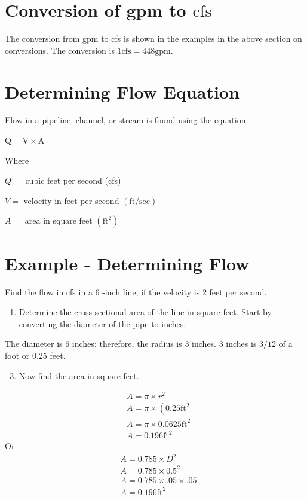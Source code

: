 \documentclass[10pt]{article}
\begin{document}
\section{Conversion of gpm to $\mathrm{cfs}$}
The conversion from gpm to cfs is shown in the examples in the above section on conversions. The conversion is $1 \mathrm{cfs}=448 \mathrm{gpm}$.

\section{Determining Flow Equation}
Flow in a pipeline, channel, or stream is found using the equation:

$\mathrm{Q}=\mathrm{V} \times \mathrm{A}$

Where

$Q=$ cubic feet per second (cfs)

$V=$ velocity in feet per second $(\mathrm{ft} / \mathrm{sec})$

$A=$ area in square feet $\left(\mathrm{ft}^{2}\right)$

\section{Example - Determining Flow}
Find the flow in cfs in a 6 -inch line, if the velocity is 2 feet per second.

\begin{enumerate}
  \item Determine the cross-sectional area of the line in square feet. Start by converting the diameter of the pipe to inches.
\end{enumerate}
The diameter is 6 inches: therefore, the radius is 3 inches. 3 inches is $3 / 12$ of a foot or $0.25$ feet.

\begin{enumerate}
  \setcounter{enumi}{2}
  \item Now find the area in square feet.
\end{enumerate}
$$
\begin{aligned}
&A=\pi \times r^{2} \\
&A=\pi \times\left(0.25 \mathrm{ft}^{2}\right. \\
&A=\pi \times 0.0625 \mathrm{ft}^{2} \\
&A=0.196 \mathrm{ft}^{2}
\end{aligned}
$$
Or
$$
\begin{aligned}
&A=0.785 \times D^{2} \\
&A=0.785 \times 0.5^{2} \\
&A=0.785 \times .05 \times .05 \\
&A=0.196 \mathrm{ft}^{2}
\end{aligned}
$$
\end{document}
